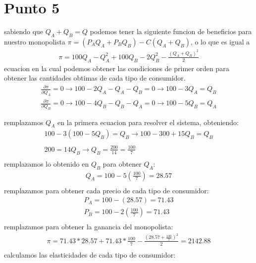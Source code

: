 \documentclass[11pt]{article}
\begin{document}
\section{Punto 5}
\begin{flushleft}
    sabiendo que $Q_A+Q_B=Q$ podemos tener la siguiente funcion de beneficios para nuestro monopolista $\pi=(P_AQ_A+P_BQ_B)-C(Q_A+Q_B)$,
    o lo que es igual a 
    \begin{align*}
        \pi=100Q_A-Q_A^2+100Q_B-2Q_B^2-\frac{(Q_A+Q_B)^2}{2}
    \end{align*}
    ecuacion en la cual podemos obtener las condiciones de primer orden para obtener las cantidades obtimas de cada tipo de consumidor.
    \begin{align*}
        \frac{\partial \pi}{\partial Q_A}=0 \to 100-2Q_A-Q_A-Q_B=0\to100-3Q_A=Q_B\\
        \frac{\partial \pi}{\partial Q_B}=0 \to 100-4Q_B-Q_B-Q_A=0\to100-5Q_B=Q_A\\~\\
    \end{align*}
    remplazamos $Q_A$ en la primera ecuacion para resolver el sistema, obteniendo:
    \begin{align*}
        100-3(100-5Q_B)=Q_B \to 100-300+15Q_B=Q_B\\~\\
        200=14Q_B \to Q_B=\frac{200}{14}=\frac{100}{7}\\
    \end{align*}
    remplazamos lo obtenido en $Q_B$ para obtener $Q_A$:
    \begin{align*}
        Q_A=100-5\left(\frac{100}{7}\right)=28.57\\
    \end{align*}
    remplazamos para obtener cada precio de cada tipo de consumidor:
    \begin{align*}
        P_A=100-(28.57)=71.43\\
        P_B=100-2\left(\frac{100}{7}\right)=71.43\\
    \end{align*}
    remplazamos para obtener la ganancia del monopolista:
    \begin{align*}
        \pi=71.43*28.57+71.43*\frac{100}{7}-\frac{(28.57+\frac{100}{7})^2}{2}=2142.88\\
    \end{align*}
    calculamos las elasticidades de cada tipo de consumidor:
    \begin{align*}

\end{align*}
\end{flushleft}
\end{document}
